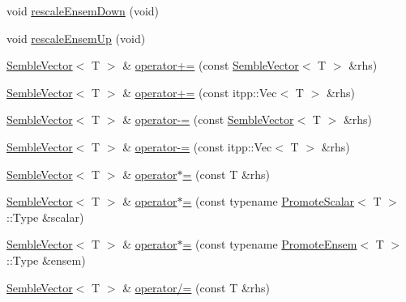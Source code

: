 \begin{DoxyCompactItemize}
\item 
void \mbox{\hyperlink{structSEMBLE_1_1SembleVector_acda114b0659e31c0130b4b6eb0d4701d}{rescale\+Ensem\+Down}} (void)
\item 
void \mbox{\hyperlink{structSEMBLE_1_1SembleVector_ade3ccfd44ba282c06bf32c0a1c800d2f}{rescale\+Ensem\+Up}} (void)
\item 
\mbox{\hyperlink{structSEMBLE_1_1SembleVector}{Semble\+Vector}}$<$ T $>$ \& \mbox{\hyperlink{structSEMBLE_1_1SembleVector_a98e60b3ac2d9966ac626257fdaf02e68}{operator+=}} (const \mbox{\hyperlink{structSEMBLE_1_1SembleVector}{Semble\+Vector}}$<$ T $>$ \&rhs)
\item 
\mbox{\hyperlink{structSEMBLE_1_1SembleVector}{Semble\+Vector}}$<$ T $>$ \& \mbox{\hyperlink{structSEMBLE_1_1SembleVector_a65530facde7e448b4c2847f2e51811a7}{operator+=}} (const itpp\+::\+Vec$<$ T $>$ \&rhs)
\item 
\mbox{\hyperlink{structSEMBLE_1_1SembleVector}{Semble\+Vector}}$<$ T $>$ \& \mbox{\hyperlink{structSEMBLE_1_1SembleVector_a600811dfe84b74625135fb1913aaa4ea}{operator-\/=}} (const \mbox{\hyperlink{structSEMBLE_1_1SembleVector}{Semble\+Vector}}$<$ T $>$ \&rhs)
\item 
\mbox{\hyperlink{structSEMBLE_1_1SembleVector}{Semble\+Vector}}$<$ T $>$ \& \mbox{\hyperlink{structSEMBLE_1_1SembleVector_ac32da1955958fd05b1b45853298e925d}{operator-\/=}} (const itpp\+::\+Vec$<$ T $>$ \&rhs)
\item 
\mbox{\hyperlink{structSEMBLE_1_1SembleVector}{Semble\+Vector}}$<$ T $>$ \& \mbox{\hyperlink{structSEMBLE_1_1SembleVector_a5e6dd715504318591b835bc2643a0c63}{operator$\ast$=}} (const T \&rhs)
\item 
\mbox{\hyperlink{structSEMBLE_1_1SembleVector}{Semble\+Vector}}$<$ T $>$ \& \mbox{\hyperlink{structSEMBLE_1_1SembleVector_a2a10bc502e9dc2f06e670dcb4eb3ac05}{operator$\ast$=}} (const typename \mbox{\hyperlink{structSEMBLE_1_1PromoteScalar}{Promote\+Scalar}}$<$ T $>$\+::Type \&scalar)
\item 
\mbox{\hyperlink{structSEMBLE_1_1SembleVector}{Semble\+Vector}}$<$ T $>$ \& \mbox{\hyperlink{structSEMBLE_1_1SembleVector_ad559efc087b0f00f20ec725270946057}{operator$\ast$=}} (const typename \mbox{\hyperlink{structSEMBLE_1_1PromoteEnsem}{Promote\+Ensem}}$<$ T $>$\+::Type \&ensem)
\item 
\mbox{\hyperlink{structSEMBLE_1_1SembleVector}{Semble\+Vector}}$<$ T $>$ \& \mbox{\hyperlink{structSEMBLE_1_1SembleVector_aac4281bd3ba03a4b1d1835cbcf1907d0}{operator/=}} (const T \&rhs)
\item 

\end{DoxyCompactItemize}
